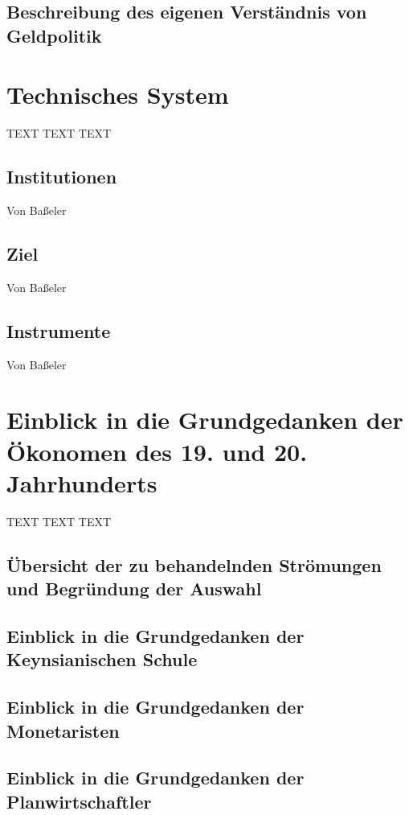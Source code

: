 \documentclass[
onecolumn,
a4paper,
abstracton,
parskip=half
,final
]{scrartcl}
\begin{document}
\subsection{Beschreibung des eigenen Verst{\"a}ndnis von Geldpolitik}

\clearpage

\section{Technisches System}
\label{sec1:technischesSystem}
TEXT TEXT TEXT
\subsection{Institutionen} Von Ba{\ss}eler
\subsection{Ziel}  Von Ba{\ss}eler
\subsection{Instrumente}  Von Ba{\ss}eler

\clearpage






\section{Einblick in die Grundgedanken der {\"O}konomen des 19. und 20. Jahrhunderts}
\label{sec1:stroemungen}
TEXT TEXT TEXT
\subsection{{\"U}bersicht der zu behandelnden Str{\"o}mungen und Begr{\"u}ndung der Auswahl}
\subsection{Einblick in die Grundgedanken der Keynsianischen Schule}

\subsection{Einblick in die Grundgedanken der Monetaristen}

\subsection{Einblick in die Grundgedanken der Planwirtschaftler}
\end{document}
